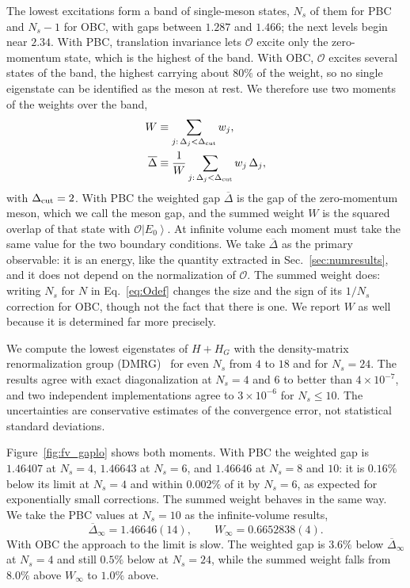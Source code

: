 \documentclass[twocolumn,superscriptaddress,showpacs,nofootinbib,notitlepage,preprintnumbers,secnumarabic,amssymb, floatfix, nobibnotes, aps, prd]{revtex4-2}
\newcommand{\ket}[1]{\left| #1 \right>} %
\begin{document}
The lowest excitations form a band of single-meson states, $N_s$ of them for PBC and $N_s-1$ for OBC, with gaps between $1.287$ and $1.466$; the next levels begin near $2.34$.
With PBC, translation invariance lets $\mathcal{O}$ excite only the zero-momentum state, which is the highest of the band.
With OBC, $\mathcal{O}$ excites several states of the band, the highest carrying about $80\%$ of the weight, so no single eigenstate can be identified as the meson at rest.
We therefore use two moments of the weights over the band,
\begin{align}
\label{eq:Wdef}
   W &\equiv \sum_{j:\,\Delta_j<\Delta_{\rm cut}} w_j ,\\
\label{eq:Dbardef}
   \overline{\Delta} &\equiv \frac{1}{W}\sum_{j:\,\Delta_j<\Delta_{\rm cut}} w_j\,\Delta_j ,
\end{align}
with $\Delta_{\rm cut}=2$.
With PBC the weighted gap $\overline{\Delta}$ is the gap of the zero-momentum meson, which we call the meson gap, and the summed weight $W$ is the squared overlap of that state with $\mathcal{O}\ket{E_0}$.
At infinite volume each moment must take the same value for the two boundary conditions.
We take $\overline{\Delta}$ as the primary observable: it is an energy, like the quantity extracted in Sec.~\ref{sec:numresults}, and it does not depend on the normalization of $\mathcal{O}$.
The summed weight does: writing $N_s$ for $N$ in Eq.~\eqref{eq:Odef} changes the size and the sign of its $1/N_s$ correction for OBC, though not the fact that there is one.
We report $W$ as well because it is determined far more precisely.

We compute the lowest eigenstates of $H+H_G$ with the density-matrix renormalization group (DMRG)~\cite{White:1992zz} for even $N_s$ from $4$ to $18$ and for $N_s=24$.
The results agree with exact diagonalization at $N_s=4$ and $6$ to better than $4\times10^{-7}$, and two independent implementations agree to $3\times10^{-6}$ for $N_s\le10$.
The uncertainties are conservative estimates of the convergence error, not statistical standard deviations.

Figure~\ref{fig:fv_gaplo} shows both moments.
With PBC the weighted gap is $1.46407$ at $N_s=4$, $1.46643$ at $N_s=6$, and $1.46646$ at $N_s=8$ and $10$: it is $0.16\%$ below its limit at $N_s=4$ and within $0.002\%$ of it by $N_s=6$, as expected for exponentially small corrections.
The summed weight behaves in the same way.
We take the PBC values at $N_s=10$ as the infinite-volume results,
\begin{equation}
\label{eq:pbcinf}
   \overline{\Delta}_\infty = 1.46646(14), \qquad W_\infty = 0.6652838(4).
\end{equation}
With OBC the approach to the limit is slow.
The weighted gap is $3.6\%$ below $\overline{\Delta}_\infty$ at $N_s=4$ and still $0.5\%$ below at $N_s=24$, while the summed weight falls from $8.0\%$ above $W_\infty$ to $1.0\%$ above.
\end{document}
